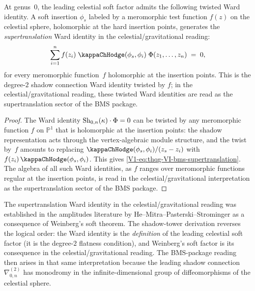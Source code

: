 \begin{corollary}
\label{cor:thqg-VI-bms-supertranslation}
At genus~$0$, the leading celestial soft factor admits the following
twisted Ward identity. A soft insertion $\phi_s$ labeled by a
meromorphic test function $f(z)$ on the celestial sphere, holomorphic
at the hard insertion points, generates the \emph{supertranslation} Ward
identity in the celestial/gravitational reading:
\begin{equation}%
\sum_{i=1}^{n} f(z_i)\;\kappaChHodge(\phi_s, \phi_i)\;
\Phi(z_1, \dotsc, z_n)
\;=\; 0,
\end{equation}
for every meromorphic function~$f$ holomorphic at the insertion
points. This is the degree-$2$ shadow
connection Ward identity twisted by $f$; in the
celestial/gravitational reading, these twisted Ward identities are
read as the supertranslation sector of the BMS package.
\end{corollary}

\begin{proof}
The Ward identity $\operatorname{Sh}_{0,n}(\kappa) \cdot \Phi = 0$ can be
twisted by any meromorphic function $f$ on $\mathbb{P}^1$ that is
holomorphic at the insertion points:
the shadow representation acts through the vertex-algebraic
module structure, and the twist by~$f$ amounts to replacing
$\kappaChHodge(\phi_s, \phi_i)/(z_s - z_i)$ with
$f(z_i)\,\kappaChHodge(\phi_s, \phi_i)$. This gives
\eqref{V1-eq:thqg-VI-bms-supertranslation}. The algebra of all
such Ward identities, as $f$ ranges over meromorphic functions
regular at the insertion points, is read in the
celestial/gravitational interpretation as the supertranslation
sector of the BMS package.
\end{proof}

\begin{remark}
The supertranslation Ward identity in the celestial/gravitational
reading was established in the amplitudes literature by
He--Mitra--Pasterski--Strominger \cite{HMPS15} as a consequence of
Weinberg's soft theorem.
The shadow-tower derivation reverses the logical order:
the Ward identity is the \emph{definition} of the leading
celestial soft factor (it is the degree-$2$ flatness condition), and
Weinberg's soft factor is its consequence in the
celestial/gravitational reading. The BMS-package
reading then arises in that same interpretation because the leading shadow connection
$\nabla^{(2)}_{0,n}$ has monodromy in the infinite-dimensional
group of diffeomorphisms of the celestial sphere.
\end{remark}

